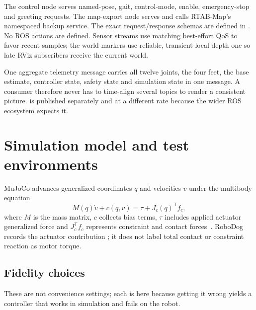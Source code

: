 \documentclass[11pt,a4paper]{article}
\begin{document}
The control node serves named-pose, gait, control-mode, enable, emergency-stop
and greeting requests. The map-export node serves
 and calls RTAB-Map's namespaced backup
service. The exact request/response schemas are defined in
. No ROS actions are defined. Sensor streams use matching
best-effort QoS to favor recent samples; the world markers use reliable,
transient-local depth one so late RViz subscribers receive the current world.

\begin{decision}{One aggregate telemetry message}
 carries all twelve joints, the four feet, the base estimate,
controller state, safety state and simulation state in one message. A consumer
therefore never has to time-align several topics to render a consistent picture.
 is published separately and at a different rate because
the wider ROS ecosystem expects it.
\end{decision}

\section{Simulation model and test environments}


MuJoCo advances generalized coordinates $q$ and velocities $v$ under the
multibody equation
\[
  M(q)\dot v+c(q,v)=\tau+J_c(q)^{\mathsf T}f_c,
\]
where $M$ is the mass matrix, $c$ collects bias terms, $\tau$ includes applied
actuator generalized force and $J_c^{\mathsf T}f_c$ represents constraint and
contact forces~\cite{mujoco-paper,mujoco-computation}. RoboDog records the
actuator contribution ; it does not label total contact or
constraint reaction as motor torque.

\subsection{Fidelity choices}

These are not convenience settings; each is here because getting it wrong yields
a controller that works in simulation and fails on the robot.
\end{document}
